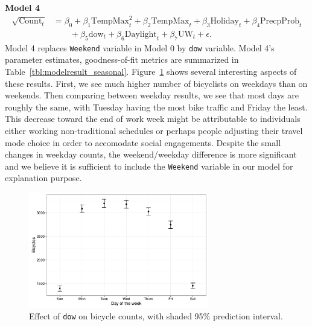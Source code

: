 \documentclass [11pt, proquest] {uwthesis}[2015/03/03]
\begin{document}
\textbf{Model 4}
\begin{align}
\sqrt{\text{Count}_t} &= \beta_0 + \beta_1 \text{TempMax}^2_t + \beta_2 \text{TempMax}_t + \beta_3 \text{Holiday}_t + \beta_4 \text{PrecpProb}_t \nonumber\\
&\qquad + \beta_5 \text{dow}_t  + \beta_6 \text{Daylight}_t + \beta_7 \text{UW}_t + \epsilon.\label{eqref:model4}
\end{align}
Model 4 replaces \texttt{Weekend} variable in Model 0 by \texttt{dow} variable. Model 4's parameter estimates, goodness-of-fit metrics are summarized in Table~\ref{tbl:modelresult_seasonal}. Figure~\ref{fig:dow} shows several interesting aspects of these results. First, we see much higher number of bicyclists on weekdays than on weekends. Then comparing between weekday results, we see that most days are roughly the same, with Tuesday having the most bike traffic and Friday the least. This decrease toward the end of work week might be attributable to individuals either working non-traditional schedules or perhaps people adjusting their travel mode choice in order to accomodate social engagements. Despite the small changes in weekday counts, the weekend/weekday difference is more significant and we believe it is sufficient to include the \texttt{Weekend} variable in our model for explanation purpose.

\begin{figure}
\centering
   \includegraphics[width=0.7\textwidth]{figures/sim/dow} 
  \caption{Effect of \texttt{dow} on bicycle counts, with shaded 95\% prediction interval.}
  \label{fig:dow}
\end{figure}
\end{document}
